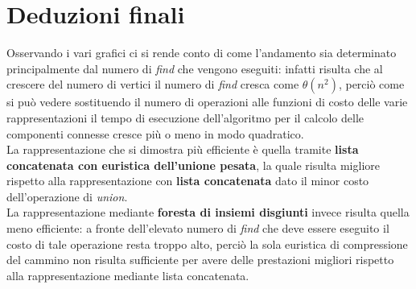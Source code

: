 \documentclass[12pt]{article}
\begin{document}
\section{Deduzioni finali}
Osservando i vari grafici ci si rende conto di come l'andamento sia determinato principalmente dal numero di \textit{find} che vengono eseguiti: infatti risulta che al crescere del numero di vertici il numero di \textit{find} cresca come $\theta(n^2)$, perciò come si può vedere sostituendo il numero di operazioni alle funzioni di costo delle varie rappresentazioni il tempo di esecuzione dell'algoritmo per il calcolo delle componenti connesse cresce più o meno in modo quadratico.\\
La rappresentazione che si dimostra più efficiente è quella tramite \textbf{lista concatenata con euristica dell'unione pesata}, la quale risulta migliore rispetto alla rappresentazione con \textbf{lista concatenata} dato il minor costo dell'operazione di \textit{union}.\\
La rappresentazione mediante \textbf{foresta di insiemi disgiunti} invece risulta quella meno efficiente: a fronte dell'elevato numero di \textit{find} che deve essere eseguito il costo di tale operazione resta troppo alto, perciò la sola euristica di compressione del cammino non risulta sufficiente per avere delle prestazioni migliori rispetto alla rappresentazione mediante lista concatenata.

\printbibliography
\end{document}
